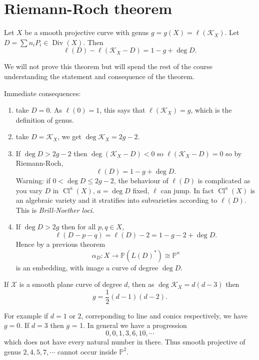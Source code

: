 \documentclass[a4paper]{article}
\DeclareMathOperator{\Cl}{Cl}
\renewcommand*{\P}{\mathbb{P}}
\DeclareMathOperator{\Div}{Div} %
\begin{document}
\section{Riemann-Roch theorem}

\begin{theorem}
  Let \(X\) be a smooth projective curve with genus \(g = g(X) = \ell(\mathcal K_X)\). Let \(D = \sum n_i P_i \in \Div(X)\). Then
  \[
    \ell(D) - \ell(\mathcal K_X - D) = 1 - g + \deg D.
  \]
\end{theorem}
We will not prove this theorem but will spend the rest of the course understanding the statement and consequence of the theorem.

Immediate consequences:
\begin{enumerate}
\item take \(D = 0\). As \(\ell(0) = 1\), this says that \(\ell(\mathcal K_X) = g\), which is the definition of genus.
\item take \(D = \mathcal K_X\), we get \(\deg \mathcal K_X = 2g - 2\).
\item If \(\deg D > 2g - 2\) then \(\deg (\mathcal K_X - D) < 0\) so \(\ell(\mathcal K_X - D) = 0\) so by Riemann-Roch,
  \[
    \ell(D) = 1 - g + \deg D.
  \]
  Warning: if \(0 < \deg D \leq 2g - 2\), the behaviour of \(\ell(D)\) is complicated as you vary \(D\) in \(\Cl^a(X)\), \(a = \deg D\) fixed, \(\ell\) can jump. In fact \(\Cl^a(X)\) is an algebraic variety and it stratifies into subvarieties according to \(\ell(D)\). This is \emph{Brill-Noether loci}.
\item If \(\deg D > 2g\) then for all \(p, q \in X\),
  \[
    \ell(D - p - q) = \ell(D) - 2 = 1- g - 2 + \deg D.
  \]
  Hence by a previous theorem
  \[
    \alpha_D: X \to \P(L(D)^*) \cong \P^n
  \]
  is an embedding, with image a curve of degree \(\deg D\).
\end{enumerate}

\begin{corollary}
  If \(\mathcal X\) is a smooth plane curve of degree \(d\), then as \(\deg \mathcal K_X = d(d - 3)\) then
  \[
    g = \frac{1}{2}(d - 1)(d - 2).
  \]
\end{corollary}

For example if \(d = 1\) or \(2\), correponding to line and conics respectively, we have \(g = 0\). If \(d = 3\) then \(g\) = 1. In general we have a progression
\[
  0, 0, 1, 3, 6, 10, \cdots
\]
which does not have every natural number in there. Thus smooth projective of genus \(2, 4, 5, 7, \cdots\) cannot occur inside \(\P^2\).
\end{document}
